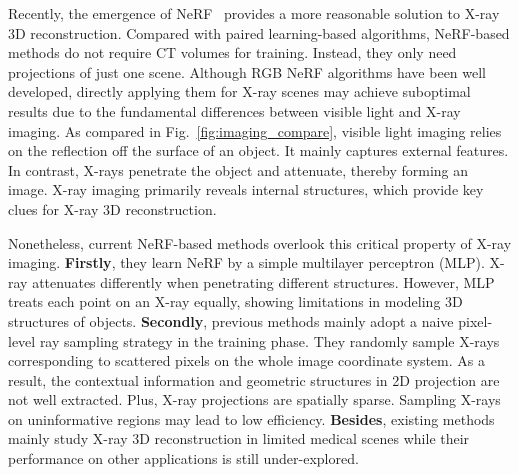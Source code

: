 \documentclass[10pt,twocolumn,letterpaper]{article}
\begin{document}
Recently, the emergence of NeRF~\cite{nerf}  provides a more reasonable solution to X-ray 3D reconstruction. Compared with paired learning-based algorithms, NeRF-based methods do not require CT volumes for training. Instead, they only need projections of just one scene. Although RGB NeRF algorithms have been well developed, directly applying them for X-ray scenes may achieve suboptimal results due to the fundamental differences between visible light and X-ray imaging. As compared in Fig.~\ref{fig:imaging_compare}, visible light imaging relies on the reflection off the surface of an object. It mainly captures external features. In contrast, X-rays penetrate the object and attenuate, thereby forming an image. X-ray imaging primarily reveals internal structures, which provide key clues for X-ray 3D reconstruction.

Nonetheless, current NeRF-based methods overlook this critical property of X-ray imaging. \textbf{Firstly}, they learn NeRF by a simple multilayer perceptron (MLP). X-ray attenuates differently when penetrating different structures. However, MLP treats each point on an X-ray equally, showing limitations in modeling 3D structures of objects. \textbf{Secondly}, previous methods mainly adopt a naive pixel-level ray sampling strategy in the training phase. They randomly sample X-rays corresponding to scattered pixels on the whole image coordinate system. As a result, the contextual information and geometric structures in 2D projection are not well extracted. Plus, X-ray projections are spatially sparse. Sampling X-rays on uninformative regions may lead to low efficiency. \textbf{Besides}, existing methods mainly study X-ray 3D reconstruction in limited medical scenes while their performance on other applications is still under-explored.
\end{document}
